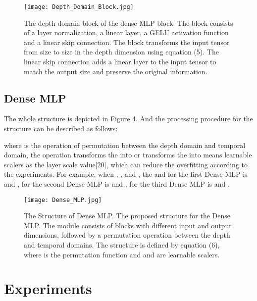 \documentclass[runningheads]{llncs}
\begin{document}
\begin{figure}
\centering
\texttt{[image: Depth\_Domain\_Block.jpg]}
\caption{The depth domain block of the dense MLP block. The block consists of a layer normalization, a linear layer, a GELU activation function and a linear skip connection. The block transforms the input tensor from size  to size  in the depth dimension using equation (5). The linear skip connection adds a linear layer to the input tensor to match the output size and preserve the original information. } \label{fig3}
\end{figure}

\subsection{Dense MLP}
The whole structure is depicted in Figure 4. And the processing procedure for the structure can be described as follows:

where  is the operation of permutation between the depth domain and temporal domain, the operation transforms the   into    or transforms the into  means learnable scalers as the layer scale value[20], which can reduce the overfitting according to the experiments. For example, when , ,  and , the  and  for the first Dense MLP is  and , for the second Dense MLP is  and , for the third Dense MLP is  and .

\begin{figure}
\centering
\texttt{[image: Dense\_MLP.jpg]}
\caption{The Structure of Dense MLP. The proposed structure for the Dense MLP. The module consists of blocks with different input and output dimensions, followed by a permutation operation between the depth and temporal domains. The structure is defined by equation (6), where  is the permutation function and  and  are learnable scalers. } \label{fig4}
\end{figure}

\section{Experiments}
\label{sec:pagestyle}
\end{document}
